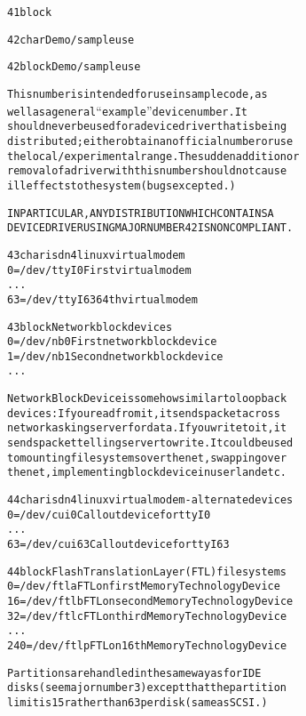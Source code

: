 \documentclass[a4paper,8pt,english]{sphinxmanual}
\begin{document}
\begin{alltt}
  41 block

  42 char       Demo/sample use

  42 block      Demo/sample use

                This number is intended for use in sample code, as
                well as a general ``example'' device number.  It
                should never be used for a device driver that is being
                distributed; either obtain an official number or use
                the local/experimental range.  The sudden addition or
                removal of a driver with this number should not cause
                ill effects to the system (bugs excepted.)

                IN PARTICULAR, ANY DISTRIBUTION WHICH CONTAINS A
                DEVICE DRIVER USING MAJOR NUMBER 42 IS NONCOMPLIANT.

  43 char       isdn4linux virtual modem
                  0 = /dev/ttyI0        First virtual modem
                    ...
                 63 = /dev/ttyI63       64th virtual modem

  43 block      Network block devices
                  0 = /dev/nb0          First network block device
                  1 = /dev/nb1          Second network block device
                    ...

                Network Block Device is somehow similar to loopback
                devices: If you read from it, it sends packet across
                network asking server for data. If you write to it, it
                sends packet telling server to write. It could be used
                to mounting filesystems over the net, swapping over
                the net, implementing block device in userland etc.

  44 char       isdn4linux virtual modem - alternate devices
                  0 = /dev/cui0         Callout device for ttyI0
                    ...
                 63 = /dev/cui63        Callout device for ttyI63

  44 block      Flash Translation Layer (FTL) filesystems
                  0 = /dev/ftla         FTL on first Memory Technology Device
                 16 = /dev/ftlb         FTL on second Memory Technology Device
                 32 = /dev/ftlc         FTL on third Memory Technology Device
                    ...
                240 = /dev/ftlp         FTL on 16th Memory Technology Device

                Partitions are handled in the same way as for IDE
                disks (see major number 3) except that the partition
                limit is 15 rather than 63 per disk (same as SCSI.)


\end{alltt}
\end{document}
